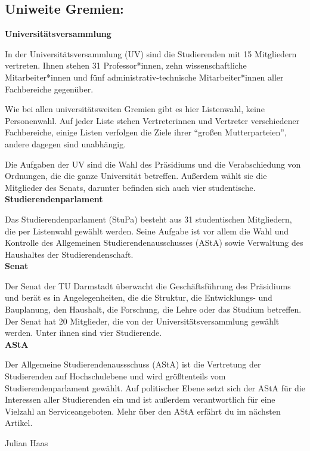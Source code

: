{\subsection*{Uniweite Gremien:}
\noindent\textbf{Universitätsversammlung}

In der Universitätsversammlung (UV) sind die Studierenden mit 15 Mitgliedern vertreten. Ihnen stehen 31 Professor*innen, zehn wissenschaftliche Mitarbeiter*innen und  fünf administrativ-technische Mitarbeiter*innen aller Fachbereiche gegenüber.

\noindent Wie bei allen universitätsweiten Gremien gibt es hier Listenwahl, keine Personenwahl. Auf jeder Liste stehen Vertreterinnen und Vertreter verschiedener Fachbereiche, einige Listen verfolgen die Ziele ihrer "`großen Mutterparteien"', andere dagegen sind unabhängig.

Die Aufgaben der UV sind die Wahl des Präsidiums und die Verabschiedung von Ordnungen, die die ganze Universität betreffen. Außerdem wählt sie die Mitglieder des Senats, darunter befinden sich auch vier studentische.\\

\noindent\textbf{Studierendenparlament}

Das Studierendenparlament (StuPa) besteht aus 31 studentischen Mitgliedern, die per Listenwahl gewählt werden. Seine Aufgabe ist vor allem die Wahl und Kontrolle des Allgemeinen Studierendenausschusses (AStA) sowie Verwaltung des Haushaltes der Studierendenschaft.\\

\noindent\textbf{Senat}

Der Senat der TU Darmstadt überwacht die Geschäftsführung des Präsidiums und berät es in Angelegenheiten, die die Struktur, die Entwicklungs- und Bauplanung, den Haushalt, die Forschung, die Lehre oder das Studium betreffen. Der Senat hat 20 Mitglieder, die von der Universitätsversammlung gewählt werden. Unter ihnen sind vier Studierende.\\

\noindent\textbf{AStA}

Der Allgemeine Studierendenaussschuss (AStA) ist die Vertretung der Studierenden auf Hochschulebene und wird größtenteils vom Studierendenparlament gewählt.
Auf politischer Ebene setzt sich der AStA für die Interessen aller Studierenden ein und ist außerdem verantwortlich für eine Vielzahl an Serviceangeboten.
Mehr über den AStA erfährt du im nächsten Artikel.

}
{Julian Haas}

